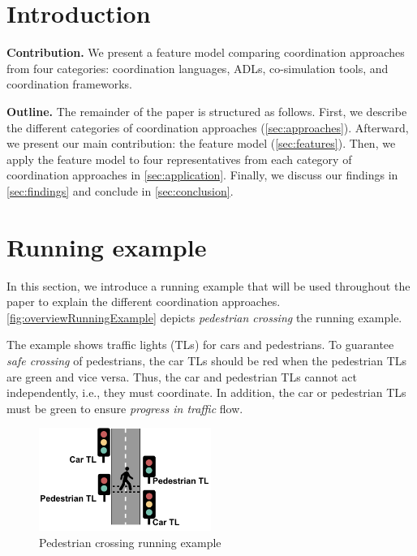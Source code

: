 \documentclass[runningheads]{llncs}
\begin{document}
\section{Introduction} \label{sec:introduction}



\textbf{Contribution.} We present a feature model comparing coordination approaches from four categories: coordination languages, ADLs, co-simulation tools, and coordination frameworks.

\textbf{Outline.} The remainder of the paper is structured as follows.
First, we describe the different categories of coordination approaches (\autoref{sec:approaches}).
Afterward, we present our main contribution: the feature model (\autoref{sec:features}).
Then, we apply the feature model to four representatives from each category of coordination approaches in \autoref{sec:application}.
Finally, we discuss our findings in \autoref{sec:findings} and conclude in \autoref{sec:conclusion}.


\section{Running example}
In this section, we introduce a running example that will be used throughout the paper to explain the different coordination approaches.
\autoref{fig:overviewRunningExample} depicts \textit{pedestrian crossing} the running example.

The example shows traffic lights (TLs) for cars and pedestrians.
To guarantee \textit{safe crossing} of pedestrians, the car TLs should be red when the pedestrian TLs are green and vice versa.
Thus, the car and pedestrian TLs cannot act independently, i.e., they must coordinate.
In addition, the car or pedestrian TLs must be green to ensure \textit{progress in traffic} flow.

\begin{figure}[ht]
	\centering
	\includegraphics[width=0.5\textwidth]{images/running_example_schematic}
	\caption{Pedestrian crossing running example}
	\label{fig:overviewRunningExample}
\end{figure}
\end{document}
